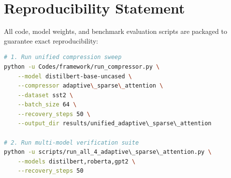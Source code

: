 \section{Reproducibility Statement}
All code, model weights, and benchmark evaluation scripts are packaged to guarantee exact reproducibility:
\begin{lstlisting}[language=bash]
# 1. Run unified compression sweep
python -u Codes/framework/run_compressor.py \
    --model distilbert-base-uncased \
    --compressor adaptive\_sparse\_attention \
    --dataset sst2 \
    --batch_size 64 \
    --recovery_steps 50 \
    --output_dir results/unified_adaptive\_sparse\_attention

# 2. Run multi-model verification suite
python -u scripts/run_all_4_adaptive\_sparse\_attention.py \
    --models distilbert,roberta,gpt2 \
    --recovery_steps 50
\end{lstlisting}
